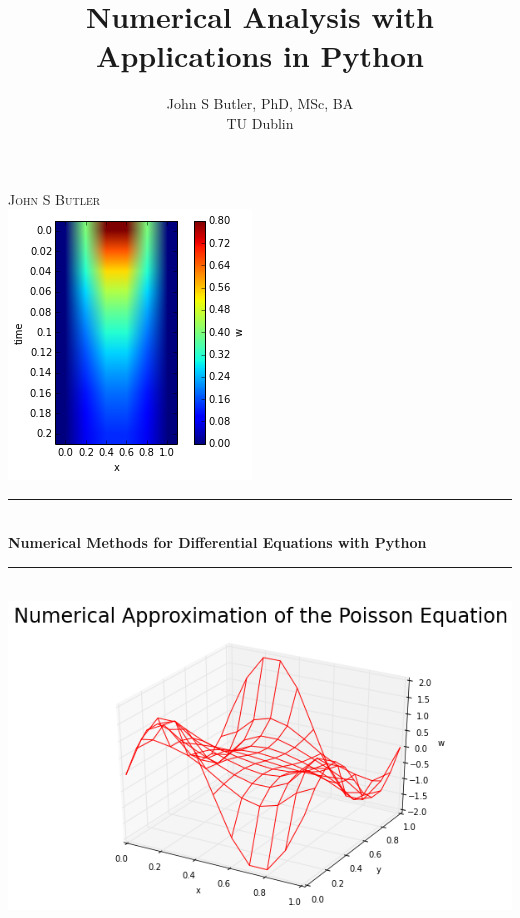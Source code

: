 \documentclass[
  oneside,
  11pt, a4paper,
  footinclude=true,
  headinclude=true,
  cleardoublepage=empty
]{scrbook}
\title{Numerical Analysis with Applications in Python}
\author{John S Butler, PhD, MSc, BA \\ TU Dublin}
\date{}
\begin{document}
\begin{titlepage}
\newcommand{\HRule}{\rule{\linewidth}{0.5mm}}
\center
\textsc{\LARGE
John S Butler
} \\[1cm]
\includegraphics[scale=0.75]{HeatEquationFigures/Fully_implicit/r_equals_half/solution_plot_image.png} \\[1cm]
\HRule \\[0.4cm]
{ \huge \bfseries Numerical Methods for Differential Equations with Python\\[0.15cm] }
\HRule \\
\includegraphics[scale=0.6]{PoissonEqn/PoissonEqn_SineWave_BC.png} 

\end{titlepage}


%
%
%
%

\end{document}
